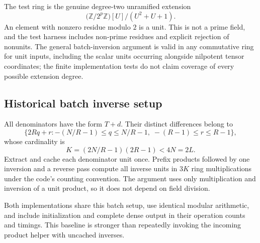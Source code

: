 \documentclass[11pt,letterpaper]{article}
\theoremstyle{remark}\newtheorem{remark}[theorem]{Remark}
\begin{document}
The test ring is the genuine degree-two unramified extension
\[
 \bigl(\mathbb Z/2^p\mathbb Z\bigr)[U]/(U^2+U+1).
\]
An element with nonzero residue modulo $2$ is a unit. This is not a prime field, and the test harness includes non-prime residues and explicit rejection of nonunits. The general batch-inversion argument is valid in any commutative ring for unit inputs, including the scalar units occurring alongside nilpotent tensor coordinates; the finite implementation tests do not claim coverage of every possible extension degree.

\subsection{Historical batch inverse setup}
All denominators have the form $T+d$. Their distinct differences belong to
\[
 \{2Rq+r: -(N/R-1)\le q\le N/R-1,\;-(R-1)\le r\le R-1\},
\]
whose cardinality is
\[
 K=(2N/R-1)(2R-1)<4N=2L.
\]
Extract and cache each denominator unit once. Prefix products followed by one inversion and a reverse pass compute all inverse units in $3K$ ring multiplications under the code's counting convention. The argument uses only multiplication and inversion of a unit product, so it does not depend on field division.

Both implementations share this batch setup, use identical modular arithmetic, and include initialization and complete dense output in their operation counts and timings. This baseline is stronger than repeatedly invoking the incoming product helper with uncached inverses.
\end{document}
